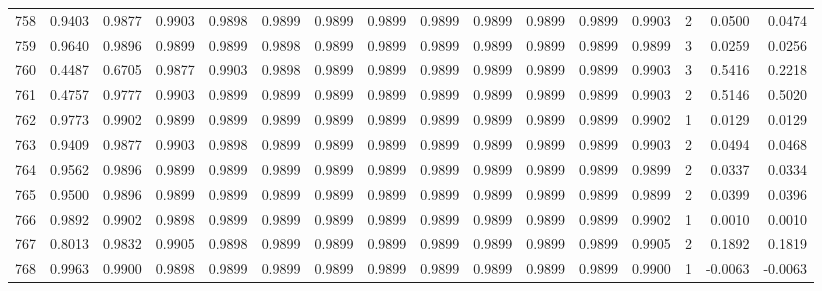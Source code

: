 \begin{tabular}{lrrrrrrrrrrrrrrr}
758 &      0.9403 &  0.9877 &  0.9903 &  0.9898 &  0.9899 &  0.9899 &  0.9899 &  0.9899 &  0.9899 &  0.9899 &   0.9899 &     0.9903 &      2 &                    0.0500 &                     0.0474 \\
759 &      0.9640 &  0.9896 &  0.9899 &  0.9899 &  0.9898 &  0.9899 &  0.9899 &  0.9899 &  0.9899 &  0.9899 &   0.9899 &     0.9899 &      3 &                    0.0259 &                     0.0256 \\
760 &      0.4487 &  0.6705 &  0.9877 &  0.9903 &  0.9898 &  0.9899 &  0.9899 &  0.9899 &  0.9899 &  0.9899 &   0.9899 &     0.9903 &      3 &                    0.5416 &                     0.2218 \\
761 &      0.4757 &  0.9777 &  0.9903 &  0.9899 &  0.9899 &  0.9899 &  0.9899 &  0.9899 &  0.9899 &  0.9899 &   0.9899 &     0.9903 &      2 &                    0.5146 &                     0.5020 \\
762 &      0.9773 &  0.9902 &  0.9899 &  0.9899 &  0.9899 &  0.9899 &  0.9899 &  0.9899 &  0.9899 &  0.9899 &   0.9899 &     0.9902 &      1 &                    0.0129 &                     0.0129 \\
763 &      0.9409 &  0.9877 &  0.9903 &  0.9898 &  0.9899 &  0.9899 &  0.9899 &  0.9899 &  0.9899 &  0.9899 &   0.9899 &     0.9903 &      2 &                    0.0494 &                     0.0468 \\
764 &      0.9562 &  0.9896 &  0.9899 &  0.9899 &  0.9899 &  0.9899 &  0.9899 &  0.9899 &  0.9899 &  0.9899 &   0.9899 &     0.9899 &      2 &                    0.0337 &                     0.0334 \\
765 &      0.9500 &  0.9896 &  0.9899 &  0.9899 &  0.9899 &  0.9899 &  0.9899 &  0.9899 &  0.9899 &  0.9899 &   0.9899 &     0.9899 &      2 &                    0.0399 &                     0.0396 \\
766 &      0.9892 &  0.9902 &  0.9898 &  0.9899 &  0.9899 &  0.9899 &  0.9899 &  0.9899 &  0.9899 &  0.9899 &   0.9899 &     0.9902 &      1 &                    0.0010 &                     0.0010 \\
767 &      0.8013 &  0.9832 &  0.9905 &  0.9898 &  0.9899 &  0.9899 &  0.9899 &  0.9899 &  0.9899 &  0.9899 &   0.9899 &     0.9905 &      2 &                    0.1892 &                     0.1819 \\
768 &      0.9963 &  0.9900 &  0.9898 &  0.9899 &  0.9899 &  0.9899 &  0.9899 &  0.9899 &  0.9899 &  0.9899 &   0.9899 &     0.9900 &      1 &                   -0.0063 &                    -0.0063 \\

\end{tabular}
